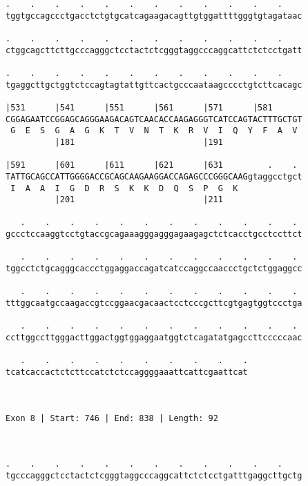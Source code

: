 \documentclass{article}
\begin{document}
\begin{Verbatim}
.    .    .    .    .    .    .    .    .    .    .    .    
tggtgccagccctgacctctgtgcatcagaagacagttgtggattttgggtgtagataac
                                                            
.    .    .    .    .    .    .    .    .    .    .    .    
ctggcagcttcttgcccagggctcctactctcgggtaggcccaggcattctctcctgatt
                                                            
.    .    .    .    .    .    .    .    .    .    .    .    
tgaggcttgctggtctccagtagtattgttcactgcccaataagcccctgtcttcacagc
                                                            
|531      |541      |551      |561      |571      |581      
CGGAGAATCCGGAGCAGGGAAGACAGTCAACACCAAGAGGGTCATCCAGTACTTTGCTGT
 G  E  S  G  A  G  K  T  V  N  T  K  R  V  I  Q  Y  F  A  V 
          |181                          |191                
  
|591      |601      |611      |621      |631         .    . 
TATTGCAGCCATTGGGGACCGCAGCAAGAAGGACCAGAGCCCGGGCAAGgtaggcctgct
 I  A  A  I  G  D  R  S  K  K  D  Q  S  P  G  K             
          |201                          |211                
  
   .    .    .    .    .    .    .    .    .    .    .    . 
gccctccaaggtcctgtaccgcagaaagggagggagaagagctctcacctgcctccttct
                                                            
   .    .    .    .    .    .    .    .    .    .    .    . 
tggcctctgcagggcaccctggaggaccagatcatccaggccaaccctgctctggaggcc
                                                            
   .    .    .    .    .    .    .    .    .    .    .    . 
tttggcaatgccaagaccgtccggaacgacaactcctcccgcttcgtgagtggtccctga
                                                            
   .    .    .    .    .    .    .    .    .    .    .    . 
ccttggccttgggacttggactggtggaggaatggtctcagatatgagccttcccccaac
                                                            
   .    .    .    .    .    .    .    .    .    .
tcatcaccactctcttccatctctccaggggaaattcattcgaattcat
                                                 
                                                 
 
Exon 8 | Start: 746 | End: 838 | Length: 92



.    .    .    .    .    .    .    .    .    .    .    .    
tgcccagggctcctactctcgggtaggcccaggcattctctcctgatttgaggcttgctg
                                                            

\end{Verbatim}
\end{document}
